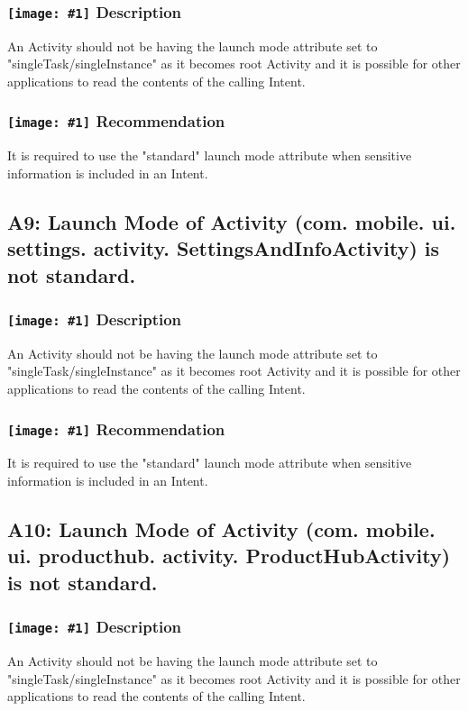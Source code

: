 \documentclass[12p]{article}
\newcommand{\icon}[1]{\texttt{[image: \#1]}}
\begin{document}
\subsubsection*{\protect\icon{/home/miki/Documents/GITHUB/AndroidPermissions/python/vulns/report_icons/basic_sheet.png} Description}
An Activity should not be having the launch mode attribute set to "singleTask/singleInstance" as it becomes root Activity and it is possible for other applications to read the contents of the calling Intent.
\subsubsection*{\protect\icon{/home/miki/Documents/GITHUB/AndroidPermissions/python/vulns/report_icons/basic_todo.png} Recommendation}
It is required to use the "standard" launch mode attribute when sensitive information is included in an Intent.
\subsection{A9: Launch Mode of Activity (com. mobile. ui. settings. activity. SettingsAndInfoActivity) is not standard.}
\subsubsection*{\protect\icon{/home/miki/Documents/GITHUB/AndroidPermissions/python/vulns/report_icons/basic_sheet.png} Description}
An Activity should not be having the launch mode attribute set to "singleTask/singleInstance" as it becomes root Activity and it is possible for other applications to read the contents of the calling Intent.
\subsubsection*{\protect\icon{/home/miki/Documents/GITHUB/AndroidPermissions/python/vulns/report_icons/basic_todo.png} Recommendation}
It is required to use the "standard" launch mode attribute when sensitive information is included in an Intent.
\subsection{A10: Launch Mode of Activity (com. mobile. ui. producthub. activity. ProductHubActivity) is not standard.}
\subsubsection*{\protect\icon{/home/miki/Documents/GITHUB/AndroidPermissions/python/vulns/report_icons/basic_sheet.png} Description}
An Activity should not be having the launch mode attribute set to "singleTask/singleInstance" as it becomes root Activity and it is possible for other applications to read the contents of the calling Intent.
\end{document}
